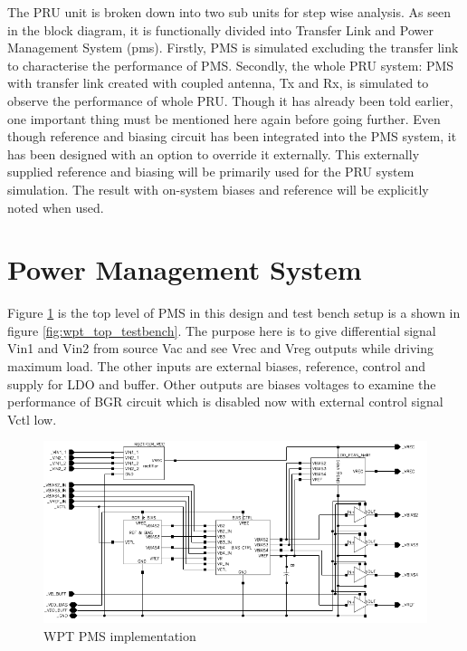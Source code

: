 \documentclass[12pt,a4paper,UKenglish]{article}
\begin{document}
The PRU unit is broken down into two sub units for step wise analysis. As seen in the block diagram, it is functionally divided into Transfer Link and 
Power Management System (\acrshort{pms}). Firstly, PMS is simulated excluding the transfer link to characterise the performance of PMS. Secondly, the whole PRU system: PMS with transfer link created with coupled antenna, Tx and Rx, is simulated to observe the performance of whole PRU. Though it has already been told earlier, 
one important thing must be mentioned here again before going further. Even though reference and biasing circuit has 
been integrated into the PMS system, it has been designed with an option to override it externally. This externally 
supplied reference and biasing will be primarily used for the PRU system simulation. The result with on-system biases 
and reference will be explicitly noted when used. \\

\section{Power Management System}

Figure \ref{fig:wpt_top} is the top level of PMS in this design and test bench setup is a shown in figure \ref{fig:wpt_top_testbench}. The purpose here is to give differential signal Vin1 and Vin2 from source Vac and see Vrec and Vreg outputs while driving maximum load. The other inputs are external biases, reference, control and supply for LDO and buffer. Other outputs are biases voltages to examine the performance of BGR circuit which is disabled now with external control signal Vctl low.  

\begin{figure} [H]
  \centering
  \includegraphics[width=\textwidth]{img/wpt_top.pdf} 
 \caption{WPT PMS implementation} 
\label{fig:wpt_top} 
\end{figure}
\end{document}
